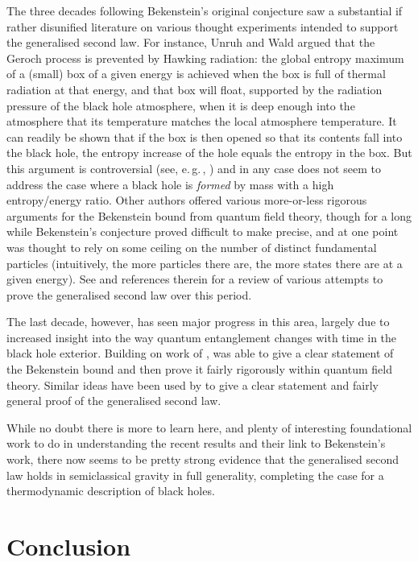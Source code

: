 \documentclass[12pt]{article}
\newcommand{\egc}{\mbox{e.\,g.\,}}
\begin{document}
The three decades following Bekenstein's original conjecture saw a substantial if rather disunified literature on various thought experiments intended to support the generalised second law. For instance, Unruh and Wald \citeyear{unruhwald1982} argued that the Geroch process is prevented by Hawking radiation: the global entropy maximum of a (small) box of a given energy is achieved when the box is full of thermal radiation at that energy, and that box will float, supported by the radiation pressure of the black hole atmosphere, when it is deep enough into the atmosphere that its temperature matches the local atmosphere temperature. It can readily be shown that if the box is then opened so that its contents fall into the black hole, the entropy increase of the hole equals the entropy in the box. But this argument is controversial (see, \egc, ) and in any case does not seem to address the case where a black hole is \emph{formed} by mass with a high entropy/energy ratio. Other authors offered various more-or-less rigorous arguments for the Bekenstein bound from quantum field theory, though for a long while Bekenstein's conjecture proved difficult to make precise, and at one point was thought to rely on some ceiling on the number of distinct fundamental particles (intuitively, the more particles there are, the more states there are at a given energy). See  and references therein for a review of various attempts to prove the generalised second law over this period.

The last decade, however, has seen major progress in this area, largely due to increased insight into the way quantum entanglement changes with time in the black hole exterior. Building on work of ,  was able to give a clear statement of the Bekenstein bound and then prove it fairly rigorously within quantum field theory. Similar ideas have been used by  to give a clear statement and fairly general proof of the generalised second law. 

While no doubt there is more to learn here, and plenty of interesting foundational work to do in understanding the recent results and their link to Bekenstein's work, there now seems to be pretty strong evidence that the generalised second law holds in semiclassical gravity in full generality, completing the case for a thermodynamic description of black holes.

\section{Conclusion}
\end{document}

